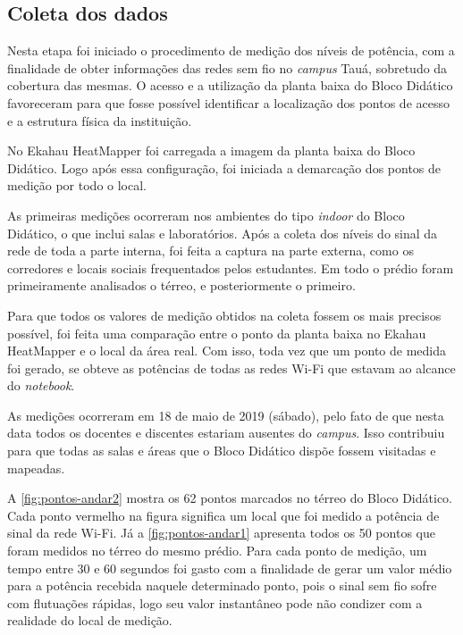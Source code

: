 \subsection{Coleta dos dados}
\label{subsec:coleta-de-dados}

Nesta etapa foi iniciado o procedimento de medição dos níveis de potência, com a finalidade de obter informações das redes sem fio no \textit{campus} Tauá, sobretudo da cobertura das mesmas. O acesso e a utilização da planta baixa do Bloco Didático favoreceram para que fosse possível identificar a localização dos pontos de acesso e a estrutura física da instituição.

No Ekahau HeatMapper foi carregada a imagem da planta baixa do Bloco Didático. Logo após essa configuração, foi iniciada a demarcação dos pontos de medição por todo o local.

As primeiras medições ocorreram nos ambientes do tipo \textit{indoor} do Bloco Didático, o que inclui salas e laboratórios. Após a coleta dos níveis do sinal da rede de toda a parte interna, foi feita a captura na parte externa, como os corredores e locais sociais frequentados pelos estudantes. Em todo o prédio foram primeiramente analisados o térreo, e posteriormente o primeiro.

Para que todos os valores de medição obtidos na coleta fossem os mais precisos possível, foi feita uma comparação entre o ponto da planta baixa no Ekahau HeatMapper e o local da área real. Com isso, toda vez que um ponto de medida foi gerado, se obteve as potências de todas as redes Wi-Fi que estavam ao alcance do \textit{notebook}.

As medições ocorreram em 18 de maio de 2019 (sábado), pelo fato de que nesta data todos os docentes e discentes estariam ausentes do \textit{campus}. Isso contribuiu para que todas as salas e áreas que o Bloco Didático dispõe fossem visitadas e mapeadas.

A \autoref{fig:pontos-andar2} mostra os 62 pontos marcados no térreo do Bloco Didático. Cada ponto vermelho na figura significa um local que foi medido a potência de sinal da rede Wi-Fi. Já a \autoref{fig:pontos-andar1} apresenta todos os 50 pontos que foram medidos no térreo do mesmo prédio. Para cada ponto de medição, um tempo entre 30 e 60 segundos foi gasto com a finalidade de gerar um valor médio para a potência recebida naquele determinado ponto, pois o sinal sem fio sofre com flutuações rápidas, logo seu valor instantâneo pode não condizer com a realidade do local de medição.

